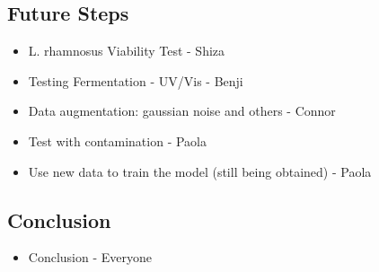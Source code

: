 \documentclass[final, 3p, 11pt]{elsarticle}
\begin{document}
\subsection*{Future Steps}
\begin{itemize}
    \item L. rhamnosus Viability Test - Shiza
    \item Testing Fermentation - UV/Vis - Benji
    \item Data augmentation: gaussian noise and others - Connor
    \item Test with contamination - Paola
    \item Use new data to train the model (still being obtained) - Paola
\end{itemize}

\subsection*{Conclusion}
\begin{itemize}
    \item Conclusion - Everyone
\end{itemize}

\end{document}
